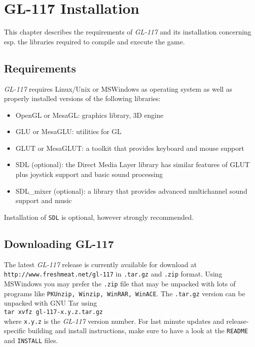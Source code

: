 \chapter{GL-117 Installation}
\label{chap:installation}

This chapter describes the requirements of \emph{GL-117} and its installation
concerning esp. the libraries required to compile and execute the game.

\section{Requirements}
\label{sec:requirements}

\emph{GL-117} requires Linux/Unix or MSWindows as operating system as well as
properly installed versions of the following libraries:
\begin{itemize}
\item{OpenGL or MesaGL: graphics library, 3D engine}
\item{GLU or MesaGLU: utilities for GL}
\item{GLUT or MesaGLUT: a toolkit that provides keyboard and mouse support}
\item{SDL (optional): the Direct Media Layer library has similar features of GLUT plus joystick
support and basic sound processing}
\item{SDL\_mixer (optional): a library that provides advanced multichannel sound
support and music}
\end{itemize}

Installation of \texttt{SDL} is optional, however strongly recommended.

\section{Downloading GL-117}
\label{sec:downloading_gl117}

The latest \emph{GL-117} release is currently available for download at
\texttt{http://www.freshmeat.net/gl-117} in \texttt{.tar.gz} and \texttt{.zip} format.
Using MSWindows you may prefer the \texttt{.zip} file that may be unpacked with
lots of programs like \texttt{PKUnzip, Winzip, WinRAR, WinACE}.
The \texttt{.tar.gz} version can be unpacked with GNU Tar using \\\texttt{tar xvfz
gl-117-x.y.z.tar.gz}\\ where \texttt{x.y.z} is the \emph{GL-117} version
number. For last minute updates and release-specific building and
install instructions, make sure to have a look at the
\texttt{README} and \texttt{INSTALL} files.

